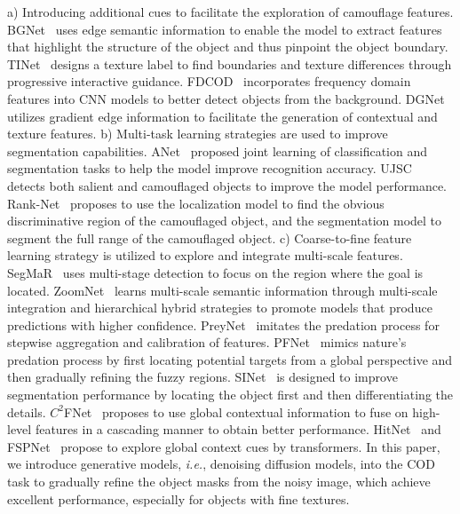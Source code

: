 \documentclass{ecai}
\begin{document}
a) Introducing additional cues to facilitate the exploration of camouflage features. BGNet~\cite{sun2022boundary} uses edge semantic information to enable the model to extract features that highlight the structure of the object and thus pinpoint the object boundary. TINet~\cite{zhu2021inferring} designs a texture label to find boundaries and texture differences through progressive interactive guidance. FDCOD~\cite{zhong2022detecting} incorporates frequency domain features into CNN models to better detect objects from the background. DGNet~\cite{ji2022gradient} utilizes gradient edge information to facilitate the generation of contextual and texture features. b) Multi-task learning strategies are used to improve segmentation capabilities. ANet~\cite{le2019anabranch} proposed joint learning of classification and segmentation tasks to help the model improve recognition accuracy. UJSC~\cite{li2021uncertainty} detects both salient and camouflaged objects to improve the model performance. Rank-Net~\cite{lv2021simultaneously} proposes to use the localization model to find the obvious discriminative region of the camouflaged object, and the segmentation model to segment the full range of the camouflaged object. c) Coarse-to-fine feature learning strategy is utilized to explore and integrate multi-scale features. SegMaR~\cite{jia2022segment} uses multi-stage detection to focus on the region where the goal is located. ZoomNet~\cite{pang2022zoom} learns multi-scale semantic information through multi-scale integration and hierarchical hybrid strategies to promote models that produce predictions with higher confidence. PreyNet~\cite{zhang2022preynet} imitates the predation process for stepwise aggregation and calibration of features. PFNet~\cite{mei2021camouflaged} mimics nature's predation process by first locating potential targets from a global perspective and then gradually refining the fuzzy regions. SINet~\cite{fan2020camouflaged} is designed to improve segmentation performance by locating the object first and then differentiating the details. $C^{2}$FNet~\cite{sun2021context} proposes to use global contextual information to fuse on high-level features in a cascading manner to obtain better performance. HitNet~\cite{hu2022high} and FSPNet~\cite{huang2023feature} propose to explore global context cues by transformers.
In this paper, we introduce generative models, \textit{i.e.}, denoising diffusion models, into the COD task to gradually refine the object masks from the noisy image, which achieve excellent performance, especially for objects with fine textures.  
\end{document}
